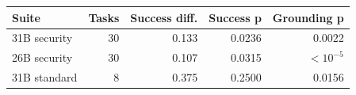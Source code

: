 \begin{tabular}{@{}lrrrr@{}}
\toprule
Suite & Tasks & Success diff. & Success p & Grounding p \\
\midrule
31B security & 30 & 0.133 & 0.0236 & 0.0022 \\
26B security & 30 & 0.107 & 0.0315 & $<10^{-5}$ \\
31B standard & 8 & 0.375 & 0.2500 & 0.0156 \\
\bottomrule
\end{tabular}
